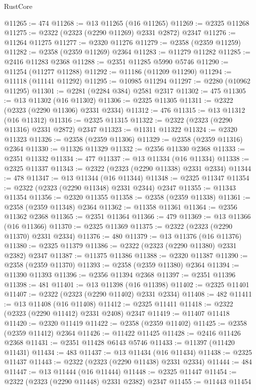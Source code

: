 \begin{lexlean}{RustCore}
\begin{coremodule}
@11265 := 474
@11268 := @13 @11265 (@16 @11265)
@11269 := @2325 @11268
@11275 := @2322 (@2323 (@2290 @11269) @2331 @2872) @2347
@11276 := @11264 @11275
@11277 := @2320 @11276
@11279 := @2358 (@2359 @11259)
@11282 := @2358 (@2359 @11269) @2364
@11283 := @11279 @11282
@11285 := @2416 @11283 @2368
@11288 := @2351 @11285 @5990 @5746
@11290 := @11254 (@11277 @11288)
@11292 := @11186 (@11209 @11290)
@11294 := @11118 (@11141 @11292)
@11295 := @10985 @11294
@11297 := @2280 (@10962 @11295)
@11301 := @2281 (@2284 @384) @2581 @2317
@11302 := 475
@11305 := @13 @11302 (@16 @11302)
@11306 := @2325 @11305
@11311 := @2322 (@2323 (@2290 @11306) @2331 @2334)
@11312 := 476
@11315 := @13 @11312 (@16 @11312)
@11316 := @2325 @11315
@11322 := @2322 (@2323 (@2290 @11316) @2331 @2872) @2347
@11323 := @11311 @11322
@11324 := @2320 @11323
@11326 := @2358 (@2359 @11306)
@11329 := @2358 (@2359 @11316) @2364
@11330 := @11326 @11329
@11332 := @2356 @11330 @2368
@11333 := @2351 @11332
@11334 := 477
@11337 := @13 @11334 (@16 @11334)
@11338 := @2325 @11337
@11343 := @2322 (@2323 (@2290 @11338) @2331 @2334)
@11344 := 478
@11347 := @13 @11344 (@16 @11344)
@11348 := @2325 @11347
@11354 := @2322 (@2323 (@2290 @11348) @2331 @2344) @2347
@11355 := @11343 @11354
@11356 := @2320 @11355
@11358 := @2358 (@2359 @11338)
@11361 := @2358 (@2359 @11348) @2364
@11362 := @11358 @11361
@11364 := @2356 @11362 @2368
@11365 := @2351 @11364
@11366 := 479
@11369 := @13 @11366 (@16 @11366)
@11370 := @2325 @11369
@11375 := @2322 (@2323 (@2290 @11370) @2331 @2334)
@11376 := 480
@11379 := @13 @11376 (@16 @11376)
@11380 := @2325 @11379
@11386 := @2322 (@2323 (@2290 @11380) @2331 @2382) @2347
@11387 := @11375 @11386
@11388 := @2320 @11387
@11390 := @2358 (@2359 @11370)
@11393 := @2358 (@2359 @11380) @2364
@11394 := @11390 @11393
@11396 := @2356 @11394 @2368
@11397 := @2351 @11396
@11398 := 481
@11401 := @13 @11398 (@16 @11398)
@11402 := @2325 @11401
@11407 := @2322 (@2323 (@2290 @11402) @2331 @2334)
@11408 := 482
@11411 := @13 @11408 (@16 @11408)
@11412 := @2325 @11411
@11418 := @2322 (@2323 (@2290 @11412) @2331 @2408) @2347
@11419 := @11407 @11418
@11420 := @2320 @11419
@11422 := @2358 (@2359 @11402)
@11425 := @2358 (@2359 @11412) @2364
@11426 := @11422 @11425
@11428 := @2416 @11426 @2368
@11431 := @2351 @11428 @6143 @5746
@11433 := @11397 (@11420 @11431)
@11434 := 483
@11437 := @13 @11434 (@16 @11434)
@11438 := @2325 @11437
@11443 := @2322 (@2323 (@2290 @11438) @2331 @2334)
@11444 := 484
@11447 := @13 @11444 (@16 @11444)
@11448 := @2325 @11447
@11454 := @2322 (@2323 (@2290 @11448) @2331 @2382) @2347
@11455 := @11443 @11454

\end{coremodule}
\end{lexlean}
